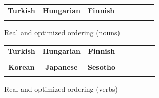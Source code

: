 \documentclass[11pt,letterpaper]{article}
\begin{document}
\begin{figure}[]
\begin{tabular}{cccccccc}
\textbf{Turkish} & \textbf{Hungarian} & \textbf{Finnish} \\
\begin{minipage}{.3\textwidth}
  
    \end{minipage}
  &
  \begin{minipage}{.3\textwidth}
  
    \end{minipage}
  &
  \begin{minipage}{.3\textwidth}
  
  \end{minipage}
  \end{tabular}
  
    \caption{Real and optimized ordering (nouns)}
    \label{tab:my_label}
\end{figure}


\begin{figure}[]

\begin{tabular}{cccccccc}
\textbf{Turkish} & \textbf{Hungarian} & \textbf{Finnish} \\
\begin{minipage}{.3\textwidth}
  
  \end{minipage}
  &
  \begin{minipage}{.3\textwidth}
  
  \end{minipage}
  &
    \begin{minipage}{.3\textwidth}
  
  \end{minipage}
  \\
  \textbf{Korean}  & \textbf{Japanese} & \textbf{Sesotho} \\
      \begin{minipage}{.3\textwidth}
  
  \end{minipage}
  &
  \begin{minipage}{.3\textwidth}
  
  \end{minipage}
  \end{tabular}
  
  
    \caption{Real and optimized ordering (verbs)}
    \label{tab:my_label}
\end{figure}
\end{document}
